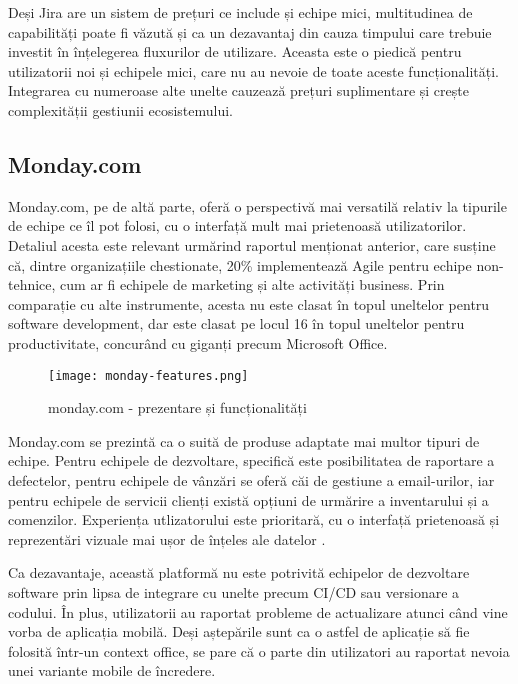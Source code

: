 Deși Jira are un sistem de prețuri ce include și echipe mici, multitudinea de capabilități poate fi văzută și ca un dezavantaj din cauza timpului care trebuie investit în înțelegerea fluxurilor de utilizare. Aceasta este o piedică pentru utilizatorii noi și echipele mici, care nu au nevoie de toate aceste funcționalități. Integrarea cu numeroase alte unelte cauzează prețuri suplimentare și crește complexității gestiunii ecosistemului.

\subsection{Monday.com}

Monday.com, pe de altă parte, oferă o perspectivă mai versatilă relativ la tipurile de echipe ce îl pot folosi, cu o interfață mult mai prietenoasă utilizatorilor. Detaliul acesta este relevant urmărind raportul menționat anterior, care susține că, dintre organizațiile chestionate, 20\% implementează Agile pentru echipe non-tehnice, cum ar fi echipele de marketing și alte activități business\cite{annual-state-of-agile-report}. Prin comparație cu alte instrumente, acesta nu este clasat în topul uneltelor pentru software development, dar este clasat pe locul 16 în topul uneltelor pentru productivitate, concurând cu giganți precum Microsoft Office\cite{6sense-monday}.

 \begin{figure}[H]
	\centering
 	 \texttt{[image: monday-features.png]}
	\caption{monday.com - prezentare și funcționalități \cite{monday-website}}
	\label{fig:monday-features}
 \end{figure}

Monday.com se prezintă ca o suită de produse adaptate mai multor tipuri de echipe. Pentru echipele de dezvoltare, specifică este posibilitatea de raportare a defectelor, pentru echipele de vânzări se oferă căi de gestiune a email-urilor, iar pentru echipele de servicii clienți există opțiuni de urmărire a inventarului și a comenzilor. Experiența utlizatorului este prioritară, cu o interfață prietenoasă și reprezentări vizuale mai ușor de înțeles ale datelor \cite{monday-website}.

Ca dezavantaje, această platformă nu este potrivită echipelor de dezvoltare software prin lipsa de integrare cu unelte precum CI/CD sau versionare a codului. În plus, utilizatorii au raportat probleme de actualizare atunci când vine vorba de aplicația mobilă. Deși aștepările sunt ca o astfel de aplicație să fie folosită într-un context office, se pare că o parte din utilizatori au raportat nevoia unei variante mobile de încredere\cite{monday-cons}.

